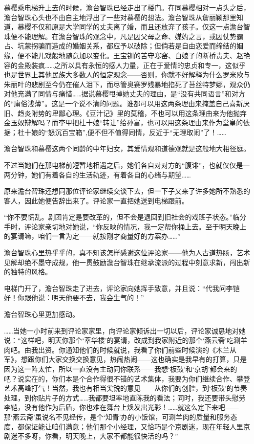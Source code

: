 \par 慕樱乘电梯升上去的时候，澹台智珠已经走出了楼门。在同慕樱相对一点头之后，澹台智珠心头也不由自主地浮出了一些对慕樱的想法。澹台智珠从詹丽颖那里知道，慕樱不仅和原是大学同学的丈夫离了婚，而且还放弃了孩子。仅这一点澹台智珠便不能理解。在澹台智珠的观念中，凡是因父母之命、媒妁之言，或因仗势霸占、坑蒙拐骗而造成的婚姻关系，都应予以破除；但倘若是自由恋爱而缔结的姻缘，便不能儿戏般地随意加以变化。王宝钏的苦守寒窑、白娘子的断桥责夫、赵艳容的金殿装疯……之所以具有永恒的感人力量，正在于爱情的忠贞和专一，这似乎也是世界上其他民族大多数人的恒定观念——否则，你就不好解释为什么罗米欧与朱丽叶的悲剧至今仍在催人泪下，而尽管奥赛罗残暴地掐死了苔丝特梦娜，观众仍对他充满了同情与痛惜……据说慕樱甩掉她丈夫的理由，是“没有共同语言”和对方的“庸俗浅薄”。这是一个说不清的问题。谁都可以用这两条理由来掩盖自己喜新厌旧、趋炎附势的卑鄙心理。《豆汁记》里的莫稽，不也可以用这条理由来为他抛弃金玉奴辩解吗？而李甲把杜十娘“转让”给孙富，也可以用这条理由来作为堂皇的依据；杜十娘的“怒沉百宝箱”,便不但不值得同情，反近于“无理取闹”了！……
\par 澹台智珠和慕樱这两个同龄的中年妇女，其爱情观和道德观就是这般地大相径庭。
\par 不过当她们在那电梯前短暂地相遇之后，她们各自对对方的“腹诽”，也就仅仅是一两分钟，她们有着各自的生活轨迹，有着各自的心绪与期望……
\par 原来澹台智珠还想同那位评论家继续交谈下去，但一下子又来了许多她所不熟悉的客人，因此她便告辞出来了。评论家一直把她送到电梯跟前。
\par “你不要慌乱。剧团肯定是要改革的，但不会是退回到旧社会的戏班子状态。”临分手时，评论家亲切地对她说，“你反映的情况，我一定帮你捅上去。至于明天晚上的宴请嘛，咱们一言为定——就按刚才商量好的方案办……”
\par 澹台智珠心里热乎乎的，真不知该怎样感谢这位评论家——他为人古道热肠，艺术见解却绝不墨守成规，他一贯鼓励澹台智珠在继承流派的过程中刻意求新，闯出新的独特的风格。
\par 电梯门开了，澹台智珠走了进去，评论家向她挥手致意，并且说：“代我问李铠好！你跟他说：明天他要不去，我会生气的！”
\par 澹台智珠心里更加感动。
\par ……当她一小时前来到评论家家里，向评论家倾诉出一切以后，评论家诚恳地对她说：“这样吧，明天你那个‘萃华楼’的宴请，改成到我家附近的那个‘燕云斋’吃涮羊肉吧。由我出资。你通知他们的时候就说，我看了你们前些时候演的《木兰从军》，想跟你们大家交换交换意见，热闹热闹——这也确实是我早有的打算，只是因为这一阵太忙，所以一直没有主动同你联系——我想‘板鼓’和‘京胡’都会来的吧？说实在的，你们本是个合作得很不错的艺术集体，我要为你们继续合作、攀登艺术高峰打气！当然，我也有相当尖锐的意见——从你们的创腔，到‘板鼓’的节奏处理，到你贴片子的方式……我都要坦率地直陈我的看法；同时，我还要带头慰劳李铠，没有他作为后盾，你也难在舞台上焕发出光彩！……就这么定下来吧——那‘燕云斋’虽说名不见经传，是个‘知青’办的小饭馆，可涮羊肉的质量和服务态度，都保证能让咱们满意；他们那个小经理，又恰巧是个京剧迷，现在年轻人里京剧迷不多呀，你看，明天晚上，大家不都能很快活的吗？”
